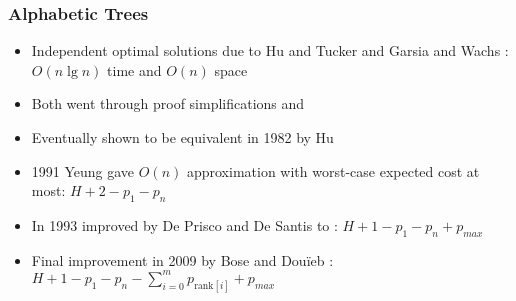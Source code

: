 \documentclass[]{beamer}
\theoremstyle{plain}
\begin{document}
\begin{frame}\frametitle{Alphabetic Trees}
\begin{itemize}

\item Independent optimal solutions due to Hu and Tucker \cite{hu1971optimal} and Garsia and Wachs \cite{garsia1977new}: $O(n \lg n)$ time and $O(n)$ space

\item Both went through proof simplifications \cite{knuth1973sorting, hu1973new, hu1979binary} and \cite{kingston1988new}

\item Eventually shown to be equivalent in 1982 by Hu \cite{Hu1982Book} 

\item 1991 Yeung gave $O(n)$ approximation with worst-case expected cost at most: $H + 2 - p_1-p_n$ \cite{yeung1991alphabetic}

\item In 1993 improved by De Prisco and De Santis to \cite{de1993binary}: $H+1-p_1-p_n+p_{max}$

\item Final improvement in 2009 by Bose and Dou\"{i}eb \cite{bose2009efficient}:
$H+1 -p_1-p_n-\sum_{i=0}^m p_{\text{rank}[i]} + p_{max}$


\end{itemize}
\end{frame}
\end{document}
